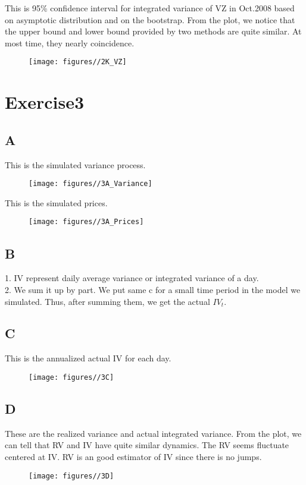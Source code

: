 \documentclass{report}
\begin{document}
This is 95\% confidence interval for integrated variance of VZ in Oct.2008 based on asymptotic distribution and on the bootstrap. From the plot, we notice that the upper bound and lower bound provided by two methods are quite similar. At most time, they nearly coincidence. 
\begin{figure}[H]
        \centering 
         \texttt{[image: figures//2K\_VZ]}
\end{figure}

\section{ Exercise3}

\subsection{A}
This is  the simulated variance process.
\begin{figure}[H]
        \centering 
         \texttt{[image: figures//3A\_Variance]}
\end{figure}

This is the simulated prices.
\begin{figure}[H]
        \centering 
         \texttt{[image: figures//3A\_Prices]}
\end{figure}

\subsection{B}
1. IV represent daily average variance or integrated variance of a day.\\
2. We sum it up by part. We put same c for a small time period in the model we simulated. Thus, after summing them, we get the actual $ IV_{t} $.

\subsection{C}
This is the annualized actual IV for each day.
\begin{figure}[H]
        \centering 
         \texttt{[image: figures//3C]}
\end{figure}

\subsection{D}
These are the realized variance and actual integrated variance. From the plot, we can tell that RV and IV have quite similar dynamics. The RV seems fluctuate centered at IV. RV is an good estimator of IV since there is no jumps.
\begin{figure}[H]
        \centering 
         \texttt{[image: figures//3D]}
\end{figure}
\end{document}
